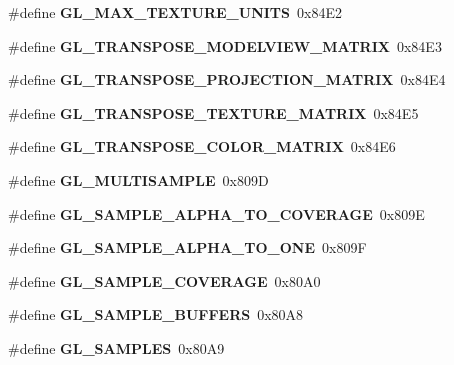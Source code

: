 \begin{DoxyCompactItemize}
\item 
\#define {\bfseries G\+L\+\_\+\+M\+A\+X\+\_\+\+T\+E\+X\+T\+U\+R\+E\+\_\+\+U\+N\+I\+T\+S}~0x84\+E2\label{_s_d_l__opengl_8h_a8f6ece15f415fdb5e36304c8f97ca6e5}

\item 
\#define {\bfseries G\+L\+\_\+\+T\+R\+A\+N\+S\+P\+O\+S\+E\+\_\+\+M\+O\+D\+E\+L\+V\+I\+E\+W\+\_\+\+M\+A\+T\+R\+I\+X}~0x84\+E3\label{_s_d_l__opengl_8h_a0c34ffa53a0274d9c166bdc4df2acc74}

\item 
\#define {\bfseries G\+L\+\_\+\+T\+R\+A\+N\+S\+P\+O\+S\+E\+\_\+\+P\+R\+O\+J\+E\+C\+T\+I\+O\+N\+\_\+\+M\+A\+T\+R\+I\+X}~0x84\+E4\label{_s_d_l__opengl_8h_a19b1e353ea3faed6b89763c5915671ff}

\item 
\#define {\bfseries G\+L\+\_\+\+T\+R\+A\+N\+S\+P\+O\+S\+E\+\_\+\+T\+E\+X\+T\+U\+R\+E\+\_\+\+M\+A\+T\+R\+I\+X}~0x84\+E5\label{_s_d_l__opengl_8h_aad823388048763dc1fdbaef3ee1b8fa6}

\item 
\#define {\bfseries G\+L\+\_\+\+T\+R\+A\+N\+S\+P\+O\+S\+E\+\_\+\+C\+O\+L\+O\+R\+\_\+\+M\+A\+T\+R\+I\+X}~0x84\+E6\label{_s_d_l__opengl_8h_a7454c4fee21755ef1d20da95542c6961}

\item 
\#define {\bfseries G\+L\+\_\+\+M\+U\+L\+T\+I\+S\+A\+M\+P\+L\+E}~0x809\+D\label{_s_d_l__opengl_8h_aa2b6486ff7ecee8bf04e3371f197527a}

\item 
\#define {\bfseries G\+L\+\_\+\+S\+A\+M\+P\+L\+E\+\_\+\+A\+L\+P\+H\+A\+\_\+\+T\+O\+\_\+\+C\+O\+V\+E\+R\+A\+G\+E}~0x809\+E\label{_s_d_l__opengl_8h_a974e3d03b26a60757018116abc99455f}

\item 
\#define {\bfseries G\+L\+\_\+\+S\+A\+M\+P\+L\+E\+\_\+\+A\+L\+P\+H\+A\+\_\+\+T\+O\+\_\+\+O\+N\+E}~0x809\+F\label{_s_d_l__opengl_8h_a5c64c1196bf55d6676a28e219298ac38}

\item 
\#define {\bfseries G\+L\+\_\+\+S\+A\+M\+P\+L\+E\+\_\+\+C\+O\+V\+E\+R\+A\+G\+E}~0x80\+A0\label{_s_d_l__opengl_8h_a28521a0c7005cfc7ada652c82cba801d}

\item 
\#define {\bfseries G\+L\+\_\+\+S\+A\+M\+P\+L\+E\+\_\+\+B\+U\+F\+F\+E\+R\+S}~0x80\+A8\label{_s_d_l__opengl_8h_a826c1addfb8459689d3268cd592ebe3c}

\item 
\#define {\bfseries G\+L\+\_\+\+S\+A\+M\+P\+L\+E\+S}~0x80\+A9\label{_s_d_l__opengl_8h_a1527624bc8306b779ce730bcc4f757a4}


\end{DoxyCompactItemize}
